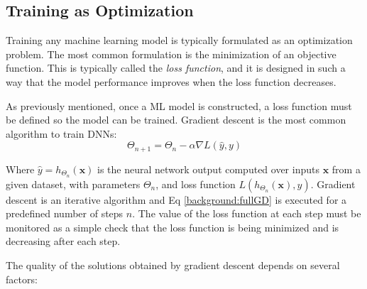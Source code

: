 \subsection{Training as Optimization}

Training any machine learning model is typically formulated as an optimization problem. The most common formulation is the minimization of an objective function. This is typically called the \textit{loss function}, and it is designed in such a way that the model performance improves when the loss function decreases.

As previously mentioned, once a ML model is constructed, a loss function must be defined so the model can be trained. Gradient descent  is the most common algorithm to train DNNs:
\vspace*{1em}
\begin{equation}
\Theta_{n+1} = \Theta_{n} - \alpha \nabla L(\hat{y}, y)
\label{background:fullGD}
\end{equation}

Where $\hat{y} = h_{\Theta_{n}}(\textbf{x})$ is the neural network output computed over inputs $\textbf{x}$ from a given dataset, with parameters $\Theta_n$, and loss function $L(h_{\Theta_{n}}(\textbf{x}), y)$. Gradient descent is an iterative algorithm and Eq \ref{background:fullGD} is executed for a predefined number of steps $n$. The value of the loss function at each step must be monitored as a simple check that the loss function is being minimized and is decreasing after each step.

The quality of the solutions obtained by gradient descent depends on several factors:

